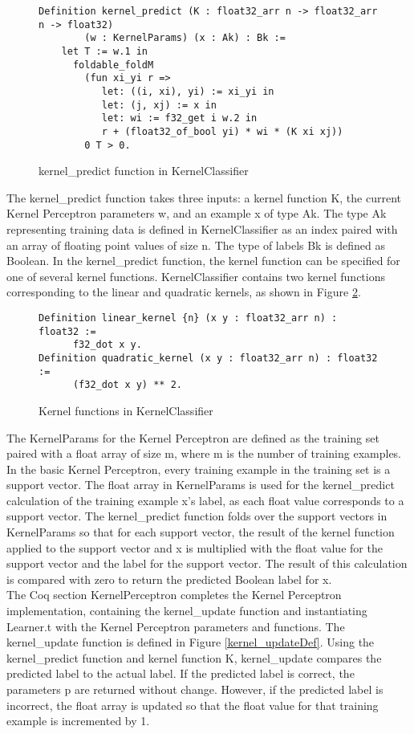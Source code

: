 \begin{figure}
    \caption{kernel\_predict function in KernelClassifier}
    \label{kernel_predictDef}
    \begin{lstlisting}
Definition kernel_predict (K : float32_arr n -> float32_arr n -> float32) 
        (w : KernelParams) (x : Ak) : Bk :=
    let T := w.1 in 
      foldable_foldM
        (fun xi_yi r =>
           let: ((i, xi), yi) := xi_yi in
           let: (j, xj) := x in 
           let: wi := f32_get i w.2 in 
           r + (float32_of_bool yi) * wi * (K xi xj))
        0 T > 0.
    \end{lstlisting}
\end{figure}

The kernel\_predict function takes three inputs: a kernel function K, the current Kernel Perceptron parameters w, and an example x of type Ak. The type Ak representing training data is defined in KernelClassifier as an index paired with an array of floating point values of size n. The type of labels Bk is defined as Boolean. In the kernel\_predict function, the kernel function can be specified for one of several kernel functions. KernelClassifier contains two kernel functions corresponding to the linear and quadratic kernels, as shown in Figure \ref{kernelfunctionsDef}.

\begin{figure}
    \caption{Kernel functions in KernelClassifier}
    \label{kernelfunctionsDef}
    \begin{lstlisting}
Definition linear_kernel {n} (x y : float32_arr n) : float32 :=
      f32_dot x y.
Definition quadratic_kernel (x y : float32_arr n) : float32 :=
      (f32_dot x y) ** 2.
    \end{lstlisting}
\end{figure}

The KernelParams for the Kernel Perceptron are defined as the training set paired with a float array of size m, where m is the number of training examples. In the basic Kernel Perceptron, every training example in the training set is a support vector. The float array in KernelParams is used for the kernel\_predict calculation of the training example x's label, as each float value corresponds to a support vector. The kernel\_predict function folds over the support vectors in KernelParams so that for each support vector, the result of the kernel function applied to the support vector and x is multiplied with the float value for the support vector and the label for the support vector. The result of this calculation is compared with zero to return the predicted Boolean label for x. 
\\The Coq section KernelPerceptron completes the Kernel Perceptron implementation, containing the kernel\_update function and instantiating Learner.t with the Kernel Perceptron parameters and functions. The kernel\_update function is defined in Figure \ref{kernel_updateDef}. Using the kernel\_predict function and kernel function K, kernel\_update compares the predicted label to the actual label. If the predicted label is correct, the parameters p are returned without change. However, if the predicted label is incorrect, the float array is updated so that the float value for that training example is incremented by 1. 

